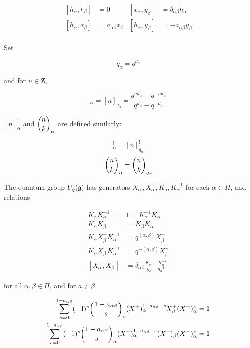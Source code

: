     \begin{align}
        \left[ h_\alpha, h_\beta \right] &= 0       &   \left[ x_\alpha, y_\beta \right] &= \delta_{\alpha\beta} h_\alpha \\
        \left[ h_\alpha, x_\beta \right] &= a_{\alpha\beta} x_\beta  &   \left[ h_\alpha, y_\beta \right] &= -a_{\alpha\beta} y_\beta \\
    \end{align}

    Set

    \begin{equation}
        q_\alpha = q^{d_\alpha}
    \end{equation}

    and for $n \in \mathbf{Z}$,

    \begin{equation}
        [n]_\alpha = [n]_{q_\alpha} = \frac{q^{nd_\alpha} - q^{-nd_\alpha}}{q^{d_\alpha} - q^{-d_\alpha}}
    \end{equation}

    $[n]_\alpha^!$ and $\dbinom{n}{k}_\alpha$ are defined similarly: 
    
    \begin{equation}
        [n]_\alpha^! = [n]_{q_{\alpha}}^!
    \end{equation}
    \begin{equation}
        \dbinom{n}{k}_\alpha = \dbinom{n}{k}_{q_\alpha}
    \end{equation}

    \begin{defn}
    \label{UqgDef}
        The quantum group $U_q(\mathfrak{g})$ has generators
        $ X^+ _\alpha, X^-_\alpha, K_\alpha, K_\alpha^{-1}$ for each $\alpha \in
        \Pi$, and relations

        \begin{align}
            K_\alpha K_\alpha^{-1} =\ &1  = K_\alpha^{-1}K_\alpha \\
            K_\alpha K_\beta &= K_\beta K_\alpha \\
            K_\alpha  X^+ _\beta K_\alpha^{-1} &= q^{(\alpha, \beta)}  X^+ _\beta \\
            K_\alpha X^-_\beta K_\alpha^{-1} &= q^{-(\alpha, \beta)}  X^+ _\beta \\
            [ X^+ _\alpha, X^-_\beta] &= \delta_{\alpha\beta} \frac{K_\alpha - K_\alpha^{-1}}{ q_\alpha - q_\alpha^{-1}} 
        \end{align}

        for all $\alpha, \beta \in \Pi$, and for $a \neq \beta$

        \begin{align}
            \sum_{s=0}^{1-a_{\alpha\beta}} (-1)^s \dbinom{1-a_{\alpha\beta}}{s}_\alpha  (X^+)_\alpha^{1-a_{\alpha\beta} - s}  X^+_\beta  (X^+)_\alpha^s  &= 0 \\
            \sum_{s=0}^{1-a_{\alpha\beta}} (-1)^s \dbinom{1-a_{\alpha\beta}}{s}_\alpha (X^-)_\alpha^{1-a_{\alpha\beta} - s} (X^-)_\beta (X^-)_\alpha^s  &= 0 
        \end{align}
    \end{defn}


